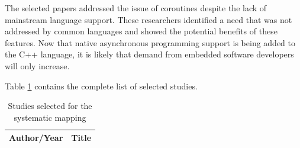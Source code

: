 \documentclass[format=acmsmall, review=false, screen=false]{acmart}
\begin{document}
The selected papers addressed the issue of coroutines despite the lack of mainstream language support. These researchers identified a need that was not addressed by common languages and showed the potential benefits of these features. Now that native asynchronous programming support is being added to the C++ language, it is likely that demand from embedded software developers will only increase. 

\iffalse 
Table \ref{dataset} contains the complete list of selected studies.

\begin{longtable}[c]{ l p{8cm} } 
	\caption{Studies selected for the systematic mapping
	\label{dataset}}\\
	\hline
	
Author/Year & Title \\ \hline
\endhead


\end{longtable}
\end{document}
